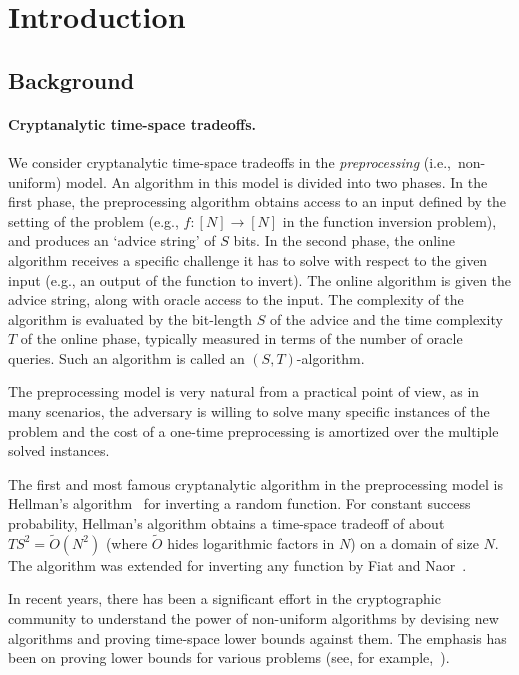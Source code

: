 \documentclass[11pt]{article}
\begin{document}
\thispagestyle{empty}

\clearpage
\setcounter{page}{1}

\section{Introduction}



\subsection{Background}


\paragraph{Cryptanalytic time-space tradeoffs.}
We consider cryptanalytic time-space tradeoffs in the \emph{preprocessing} (i.e.,~non-uniform) model.
An algorithm in this model is divided into two phases. In the first phase, the preprocessing algorithm obtains access to an input defined by the setting of the problem (e.g., $f: [N] \to [N]$ in the function inversion problem), and produces an `advice string' of $S$ bits. In the second phase, the online algorithm receives a specific challenge it has to solve with respect to the given input (e.g., an output of the function to invert).
The online algorithm is given the advice string, along with oracle access to the input. The complexity of the algorithm is evaluated by the bit-length $S$ of the advice and the time complexity $T$ of the online phase, typically measured in terms of the number of oracle queries. 
Such an algorithm is called an $(S,T)$-algorithm.


The preprocessing model is very natural from a practical point of view, as in many scenarios, the adversary is willing to solve many specific instances of the problem and the cost of a one-time preprocessing is amortized over the multiple solved instances. 

The first and most famous cryptanalytic algorithm in the preprocessing model is Hellman's algorithm~\cite{Hellman80} for inverting a random function.
For constant success probability, Hellman's algorithm obtains a time-space tradeoff of about $T S^2 = \tilde{O}(N^2)$ (where $\tilde{O}$ hides logarithmic factors in $N$) on a domain of size $N$. The algorithm was extended for inverting any function by Fiat and Naor~\cite{FiatN99}.

In recent years, there has been a significant effort in the cryptographic community to understand the power of non-uniform algorithms by devising new algorithms and proving time-space lower bounds against them. The emphasis has been on proving lower bounds for various problems (see, for example,~\cite{DodisGK17,CorettiDG18,CorettiDGS18,Corrigan-GibbsK18,Corrigan-GibbsK19,BartusekMZ19,GolovnevGHPV20,ChawinHM20,ChungGLQ20,AkshimaCDW20,GuoLLZ21,FreitagGK22,GolovnevGPS23,AkshimaBGXY24,AkshimaGL24,GajulapalliGK24,AkshimaBCGY25}).
\end{document}
